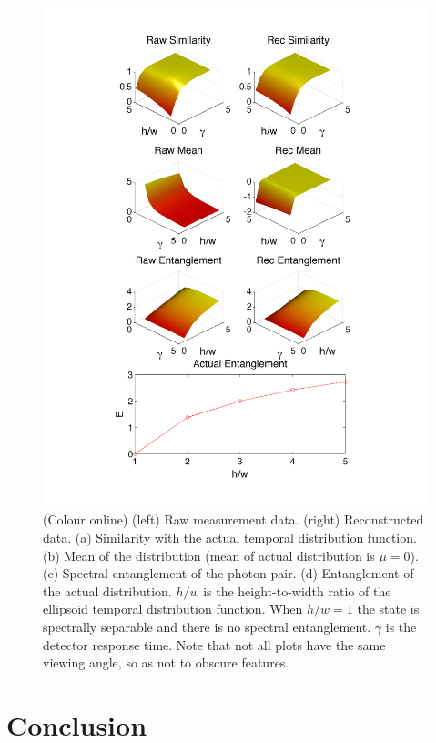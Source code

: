 \documentclass[aps,pra,twocolumn,amsmath,amssymb,color,superscriptaddress]{revtex4}
\begin{document}
\begin{figure}[!htb]
\includegraphics[width=\columnwidth]{figures/PDC_3D}
\caption{(Colour online) (left) Raw measurement data. (right) Reconstructed data. (a) Similarity with the actual temporal distribution function. (b) Mean of the distribution (mean of actual distribution is \mbox{$\mu=0$}). (c) Spectral entanglement of the photon pair. (d) Entanglement of the actual distribution. \mbox{$h/w$} is the height-to-width ratio of the ellipsoid temporal distribution function. When \mbox{$h/w=1$} the state is spectrally separable and there is no spectral entanglement. $\gamma$ is the detector response time. Note that not all plots have the same viewing angle, so as not to obscure features.} \label{fig:composite_PDC_3D}
\end{figure}

%
%

\section{Conclusion}
\end{document}
